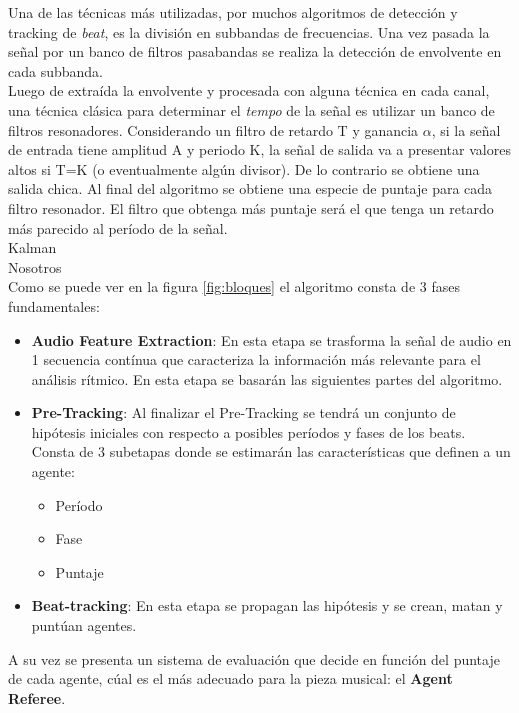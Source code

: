 \documentclass[12pt,a4paper,titlepage]{report}
\begin{document}
Una de las técnicas más utilizadas, por muchos algoritmos de detección y tracking de \emph{beat}, es la división en subbandas de frecuencias. Una vez pasada la señal por un banco de filtros pasabandas se realiza la detección de envolvente en cada subbanda.\\

Luego de extraída la envolvente y procesada con alguna técnica en cada canal, una técnica clásica para determinar el \emph{tempo} de la señal es utilizar un banco de filtros resonadores.
Considerando un filtro de retardo T y ganancia $\alpha$, si la señal de entrada tiene amplitud A y periodo K, la señal de salida va a presentar valores altos si T=K (o eventualmente algún divisor). De lo contrario se obtiene una salida chica. Al final del algoritmo se obtiene una especie de puntaje para cada filtro resonador. El filtro que obtenga más puntaje será el que tenga un retardo más parecido al período de la señal.\\

Kalman\\

Nosotros\\

Como se puede ver en la figura \ref{fig:bloques} el algoritmo consta de 3 fases fundamentales:
\begin{itemize}
\item \textbf{Audio Feature Extraction}: En esta etapa se trasforma la señal de audio en 1 secuencia contínua que caracteriza la información más relevante para el análisis rítmico. En esta etapa se basarán las siguientes partes del algoritmo.
\item \textbf{Pre-Tracking}: Al finalizar el Pre-Tracking se tendrá un conjunto de hipótesis iniciales con respecto a posibles períodos y fases de los beats. Consta de 3 subetapas donde se estimarán las características que definen a un agente:
\begin{itemize}
\item Período
\item Fase
\item Puntaje
\end{itemize}
\item \textbf{Beat-tracking}: En esta etapa se propagan las hipótesis y se crean, matan y puntúan agentes.
\end{itemize}

A su vez se presenta un sistema de evaluación que decide en función del puntaje de cada agente, cúal es el más adecuado para la pieza musical: el \textbf{Agent Referee}.
\end{document}
